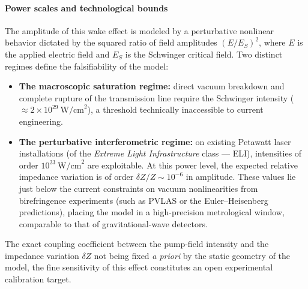 \documentclass[11pt,a4paper]{article}
\theoremstyle{plain}
\theoremstyle{remark}
\begin{document}
\paragraph{Power scales and technological bounds}
The amplitude of this wake effect is modeled by a perturbative nonlinear behavior dictated by the squared ratio of field amplitudes $(E/E_S)^2$, where $E$ is the applied electric field and $E_S$ is the Schwinger critical field. Two distinct regimes define the falsifiability of the model:
\begin{itemize}
    \item \textbf{The macroscopic saturation regime:} direct vacuum breakdown and complete rupture of the transmission line require the Schwinger intensity ($\approx 2 \times 10^{29}~\text{W/cm}^2$), a threshold technically inaccessible to current engineering.
    \item \textbf{The perturbative interferometric regime:} on existing Petawatt laser installations (of the \textit{Extreme Light Infrastructure} class --- ELI), intensities of order $10^{23}~\text{W/cm}^2$ are exploitable. At this power level, the expected relative impedance variation is of order $\delta Z/Z \sim 10^{-6}$ in amplitude. These values lie just below the current constraints on vacuum nonlinearities from birefringence experiments (such as PVLAS or the Euler--Heisenberg predictions), placing the model in a high-precision metrological window, comparable to that of gravitational-wave detectors.
\end{itemize}

The exact coupling coefficient between the pump-field intensity and the impedance variation $\delta Z$ not being fixed \textit{a priori} by the static geometry of the model, the fine sensitivity of this effect constitutes an open experimental calibration target.
\end{document}
